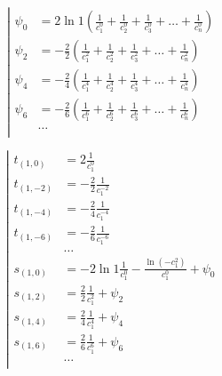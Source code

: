 \begin{equation*} \left| \begin{aligned}
\psi_0 &= 2 \ln{1}
  \left(
  \frac{1}{c_1^0}
+ \frac{1}{c_2^0}
+ \frac{1}{c_3^0}
+ \ldots
+ \frac{1}{c_n^0}
  \right) \\
%
\psi_2 &=
- \frac{2}{2}
  \left(
  \frac{1}{c_1^2}
+ \frac{1}{c_2^2}
+ \frac{1}{c_3^2}
+ \ldots
+ \frac{1}{c_n^2}
  \right) \\
%
\psi_4 &=
- \frac{2}{4}
  \left(
  \frac{1}{c_1^4}
+ \frac{1}{c_2^4}
+ \frac{1}{c_3^4}
+ \ldots
+ \frac{1}{c_n^4}
  \right) \\
%
\psi_6 &=
- \frac{2}{6}
  \left(
  \frac{1}{c_1^6}
+ \frac{1}{c_2^6}
+ \frac{1}{c_3^6}
+ \ldots
+ \frac{1}{c_n^6}
  \right) \\
%
&\ldots \\
\end{aligned} \right. \end{equation*}

\begin{equation*} \left| \begin{aligned}
t_{(1,0)} &=
  2 \frac{1}{c_1^0} \\
%
t_{(1,-2)} &=
- \frac{2}{2}
  \frac{1}{c_1^{-2}} \\
%
t_{(1,-4)} &=
- \frac{2}{4}
  \frac{1}{c_1^{-4}} \\
%
t_{(1,-6)} &=
- \frac{2}{6}
  \frac{1}{c_1^{-6}} \\
&\ldots \\
%
s_{(1,0)} &=
- 2 \ln{1}
  \frac{1}{c_1^0}
- \frac{\ln{(- c_1^2)}}{c_1^0}
+ \psi_0 \\
%
s_{(1,2)} &=
  \frac{2}{2}
  \frac{1}{c_1^2}
+ \psi_2 \\
%
s_{(1,4)} &=
  \frac{2}{4}
  \frac{1}{c_1^4}
+ \psi_4 \\
%
s_{(1,6)} &=
  \frac{2}{6}
  \frac{1}{c_1^6}
+ \psi_6 \\
%
&\ldots \\
\end{aligned} \right. \end{equation*}

